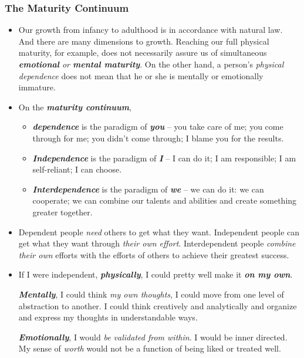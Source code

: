 \documentclass[11pt]{article}
\begin{document}
\subsubsection{The Maturity Continuum}
\begin{itemize}
\item Our growth from infancy to adulthood is in accordance with natural law. And there are many dimensions to growth. Reaching our full physical maturity, for example, does not necessarily assure us of simultaneous \emph{\textbf{emotional} or \textbf{mental maturity}}. On the other hand, a person's \emph{physical dependence} does not mean that he or she is mentally or emotionally immature.

\item On the \emph{\textbf{maturity continuum}}, 
\begin{itemize}
\item \emph{\textbf{dependence}} is the paradigm of \emph{\textbf{you}} -- you take care of me; you come through for me; you didn't come through; I blame you for the results.
\item \emph{\textbf{Independence}} is the paradigm of \emph{\textbf{I}} -- I can do it; I am responsible; I am self-reliant; I can choose.
\item \emph{\textbf{Interdependence}} is the paradigm of \emph{\textbf{we}} -- we can do it: we can cooperate; we can combine our talents and abilities and create something greater together.
\end{itemize}

\item Dependent people \textit{need} others to get what they want. Independent people can get what they want through \emph{their own effort}. Interdependent people \emph{combine} \emph{their own} efforts with the efforts of others to achieve their greatest success.

\item If I were independent, \emph{\textbf{physically}}, I could pretty well make it \emph{\textbf{on my own}}. 

\emph{\textbf{Mentally}}, I could think \emph{my own thoughts}, I could move from one level of abstraction to another. I could think creatively and analytically and organize and express my thoughts in understandable ways.

\emph{\textbf{Emotionally}}, I would \emph{be validated from within}. I would be inner directed. My sense of \emph{worth} would not be a function of being liked or treated well.


\end{itemize}
\end{document}
